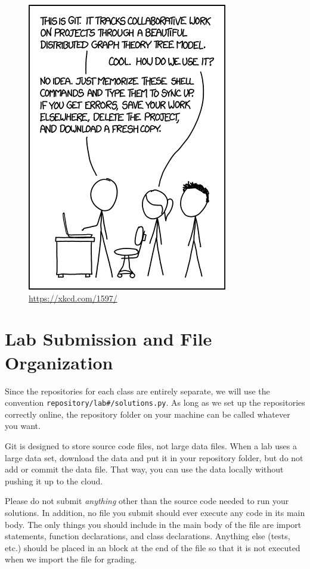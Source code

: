 \begin{figure}
\centering
\includegraphics[width=\textwidth]{xkcd1.png}
\caption{\url{https://xkcd.com/1597/}}
\end{figure}

\section*{Lab Submission and File Organization} %

Since the repositories for each class are entirely separate, we will use the convention \texttt{repository/lab\#/solutions.py}.
As long as we set up the repositories correctly online, the repository folder on your machine can be called whatever you want.

Git is designed to store source code files, not large data files.
When a lab uses a large data set, download the data and put it in your repository folder, but do not add or commit the data file.
That way, you can use the data locally without pushing it up to the cloud.

Please do not submit \emph{anything} other than the source code needed to run your solutions.
In addition, no file you submit should ever execute any code in its main body.
The only things you should include in the main body of the file are import statements, function declarations, and class declarations.
Anything else (tests, etc.) should be placed in an  block at the end of the file so that it is not executed when we import the file for grading.

